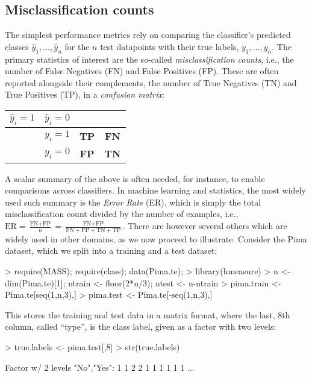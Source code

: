 \documentclass{article}
\begin{document}
\subsection{Misclassification counts}\label{sec:misclasscounts}
The simplest performance metrics rely on comparing the classifier's predicted classes $\hat{y}_1, \dots, \hat{y}_n$ for the $n$ test datapoints with their true labels, $y_1, \dots, y_n$. The primary statistics of interest are the so-called \emph{misclassification counts}, i.e., the number of False Negatives (FN) and False Positives (FP). These are often reported alongside their complements, the number of True Negatives (TN) and True Positives (TP), in a \emph{confusion matrix}:

\begin{center}
\begin{tabular}{cc|c|c}
$\hat{y}_i = 1$ & $\hat{y}_i = 0$\\\hline
& $y_i=1$ & \textbf{TP} & \textbf{FN}  \\\cline{2-4}
& $y_i=0$ & \textbf{FP} & \textbf{TN} 
\end{tabular}
\end{center}
A scalar summary of the above is often needed, for instance, to enable comparisons across classifiers. In machine learning and statistics, the most widely used such summary  is the \emph{Error Rate} (ER), which is simply the total misclassification count divided by the number of examples, i.e., $\text{ER} = \frac{\text{FN}+\text{FP}}{n} = \frac{\text{FN}+\text{FP}}{\text{FN}+\text{FP}+\text{TN}+\text{TP}}$. There are however several others which are widely used in other domains, as we now proceed to illustrate. Consider the Pima dataset, which we split into a training and a test dataset: 
\begin{Schunk}
\begin{Sinput}
> require(MASS); require(class); data(Pima.te); 
> library(hmeasure)
> n <- dim(Pima.te)[1]; ntrain <- floor(2*n/3); ntest <- n-ntrain
> pima.train <- Pima.te[seq(1,n,3),]
> pima.test <- Pima.te[-seq(1,n,3),]
\end{Sinput}
\end{Schunk}
This stores the training and test data in a matrix format, where the last, $8$th column, called ``type'', is the class label, given as a factor with two levels:
\begin{Schunk}
\begin{Sinput}
> true.labels <- pima.test[,8]
> str(true.labels)
\end{Sinput}
\begin{Soutput}
 Factor w/ 2 levels "No","Yes": 1 1 2 2 1 1 1 1 1 1 ...
\end{Soutput}
\end{Schunk}
\end{document}

